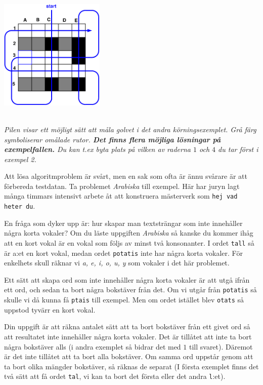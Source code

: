 \begin{multicols}{2}
\begin{center}
  \includegraphics[width=5cm]{../skolkval/dentrottemalaren/problem_statement/golv.pdf}
\end{center}
\columnbreak
~\\ 
    \emph{Pilen visar ett möjligt sätt att måla golvet i det andra körningsexemplet. Grå färg symboliserar omålade rutor. \textbf{Det finns flera möjliga lösningar på exempel\-fallen.}
Du kan t.ex byta plats på vilken av raderna $1$ och $4$ du tar först i exempel 2.
    }
\vfill
\end{multicols}

\newpage
{}

Att lösa algoritmproblem är svårt, men en sak som ofta är ännu svårare är att förbereda
testdatan. Ta problemet \textit{Arabiska} till exempel. Här har juryn lagt
många timmars intensivt arbete åt att konstruera mästerverk som \texttt{hej vad heter du}.

En fråga som dyker upp är: hur skapar man textsträngar som inte innehåller några korta vokaler?
Om du läste uppgiften \textit{Arabiska} så kanske du kommer ihåg att en kort vokal är en
vokal som följs av minst två konsonanter. I ordet \texttt{tall} så är a:et en kort vokal, medan
ordet \texttt{potatis} inte har några korta vokaler. För enkelhets skull räknar vi  \textit{a, e, i, o, u, y} 
som vokaler i det här problemet.


Ett sätt att skapa ord som inte innehåller några korta vokaler är att utgå ifrån ett ord,
och sedan ta bort några bokstäver från det. Om vi utgår från \texttt{potatis} så 
skulle vi då kunna få \texttt{ptais} till exempel. Men om ordet istället blev \texttt{otats} så uppstod
tyvärr en kort vokal.


Din uppgift är att räkna antalet sätt att ta bort bokstäver från ett givet ord så att resultatet inte
innehåller några korta vokaler. Det är tillåtet att inte ta bort några bokstäver alls (i andra exemplet
så bidrar det med $1$ till svaret). Däremot är det inte tillåtet att ta bort alla bokstäver. Om samma ord
uppstår genom att ta bort olika mängder bokstäver, så räknas de separat (I första exemplet finns det två sätt
att få ordet \texttt{tal}, vi kan ta bort det första eller det andra \texttt{l}:et).


